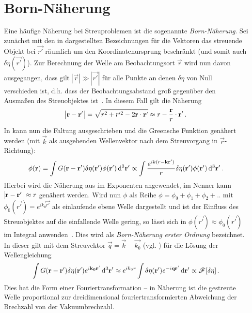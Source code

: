 \section{Born-Näherung}
Eine häufige Näherung bei Streuproblemen ist die sogenannte \textit{Born-Näherung}. Sei zunächst mit den in   dargestellten Bezeichnungen für die Vektoren das streuende Objekt bei $\vec{r'}$ räumlich um den Koordinatenursprung beschränkt (und somit auch $\delta\eta(\vec{r'})$). Zur Berechnung der Welle am Beobachtungsort $\vec{r}$ wird nun davon ausgegangen, dass gilt $|\vec{r}| \gg |\vec{r'}|$ für alle Punkte an denen $\delta\eta$ von Null verschieden ist, d.h. dass der Beobachtungsabstand groß gegenüber den Ausmaßen des Streuobjektes ist~\cite{griffiths2005}. In diesem Fall gilt die Näherung
\begin{equation}
	\abs{\mathbf{r}-\mathbf{r'}} = \sqrt{r^2+r'^2-2\mathbf{r}\cdot\mathbf{r'}} \approx r-\frac{\mathbf{r}}{r}\cdot\mathbf{r'} \,.
	\label{eq:born_r_approx}
\end{equation}
In  kann nun die Faltung ausgeschrieben und die Greensche Funktion genähert werden (mit $\vec{k}$ als ausgehenden Wellenvektor nach dem Streuvorgang in $\vec{r}$-Richtung):
\begin{equation}
\phi(\mathbf{r})=\int G(\mathbf{r}-\mathbf{r'})\delta\eta(\mathbf{r'})\phi(\mathbf{r}') \operatorname{d^3 \!} \mathbf{r'} \propto \int \frac{e^{ik(r-\mathbf{k}\mathbf{r'})}}{r}\delta\eta(\mathbf{r}')\phi(\mathbf{r}') \operatorname{d^3 \!} \mathbf{r'} \,.
\label{eq:born_ort}
\end{equation}
Hierbei wird die Näherung aus  im Exponenten angewendet, im Nenner kann $\abs{\mathbf{r}-\mathbf{r'}}\approx r$ genähert werden. Wird nun $\phi$ als Reihe $\phi=\phi_0+\phi_1+\phi_2+..$ mit $\phi_0(\vec{r'})=e^{i\vec{k_0}\vec{r'}}$ als einlaufende ebene Welle dargestellt und ist der Einfluss des Streuobjektes auf die einfallende Welle gering, so lässt sich in  $\phi(\vec{r'})\approx\phi_0(\vec{r'})$ im Integral anwenden~\cite{cowley1995}. Dies wird als \textit{Born-Näherung erster Ordnung} bezeichnet. In dieser gilt mit dem Streuvektor $\vec{q}=\vec{k}-\vec{k_0}$ (vgl. ) für die Lösung der Wellengleichung
\begin{equation}
	\label{eq:born}
	\int G(\vec{r}-\vec{r}')\delta\eta(\vec{r}') e^{i\vec{k_0}\vec{r'}}  \dift \vec{r}'\approx e^{ik_0r}\int \delta\eta(\vec{r}')e^{-i\vec{q}\vec{r}'}\dif \vec{r}'\propto \mathscr{F}[\delta\eta] \,.
\end{equation} 
Dies hat die Form einer Fouriertransformation -- in Näherung ist die gestreute Welle proportional zur dreidimensional fouriertransformierten Abweichung der Brechzahl von der Vakuumbrechzahl.



